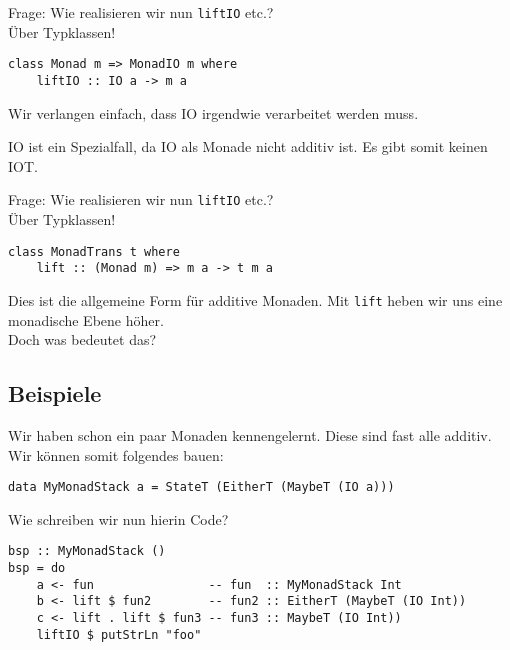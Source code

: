 \documentclass{beamer}
\begin{document}
\begin{frame}[fragile]
Frage: Wie realisieren wir nun \texttt{liftIO} etc.?\\
\pause
Über Typklassen!
\begin{verbatim}
class Monad m => MonadIO m where
    liftIO :: IO a -> m a
\end{verbatim}
Wir verlangen einfach, dass IO irgendwie verarbeitet werden muss.
\pause
\begin{important}
IO ist ein Spezialfall, da IO als Monade nicht additiv ist. Es gibt somit keinen IOT.
\end{important}
\end{frame}

\begin{frame}[fragile]
Frage: Wie realisieren wir nun \texttt{liftIO} etc.?\\
Über Typklassen!
\begin{verbatim}
class MonadTrans t where
    lift :: (Monad m) => m a -> t m a
\end{verbatim}
\pause
Dies ist die allgemeine Form für additive Monaden. Mit \texttt{lift} heben wir uns eine monadische Ebene höher.\\
Doch was bedeutet das?
\end{frame}

\subsection{Beispiele}

\begin{frame}[fragile]
Wir haben schon ein paar Monaden kennengelernt. Diese sind fast alle additiv. Wir können somit folgendes bauen:
\pause
\begin{verbatim}
data MyMonadStack a = StateT (EitherT (MaybeT (IO a)))
\end{verbatim}
\pause
Wie schreiben wir nun hierin Code?
\begin{verbatim}
bsp :: MyMonadStack ()
bsp = do
    a <- fun                -- fun  :: MyMonadStack Int
    b <- lift $ fun2        -- fun2 :: EitherT (MaybeT (IO Int))
    c <- lift . lift $ fun3 -- fun3 :: MaybeT (IO Int))
    liftIO $ putStrLn "foo"
\end{verbatim}

\end{frame}
\end{document}

